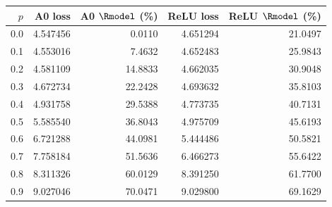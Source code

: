\begin{tabular}{rrrrr}
\toprule
$p$ & A0 loss & A0 $\Rmodel$ (\%) & ReLU loss & ReLU $\Rmodel$ (\%) \\
\midrule
0.0 & 4.547456 & 0.0110 & 4.651294 & 21.0497 \\
0.1 & 4.553016 & 7.4632 & 4.652483 & 25.9843 \\
0.2 & 4.581109 & 14.8833 & 4.662035 & 30.9048 \\
0.3 & 4.672734 & 22.2428 & 4.693632 & 35.8103 \\
0.4 & 4.931758 & 29.5388 & 4.773735 & 40.7131 \\
0.5 & 5.585540 & 36.8043 & 4.975709 & 45.6193 \\
0.6 & 6.721288 & 44.0981 & 5.444486 & 50.5821 \\
0.7 & 7.758184 & 51.5636 & 6.466273 & 55.6422 \\
0.8 & 8.311326 & 60.0129 & 8.391250 & 61.7700 \\
0.9 & 9.027046 & 70.0471 & 9.029800 & 69.1629 \\
\bottomrule
\end{tabular}
